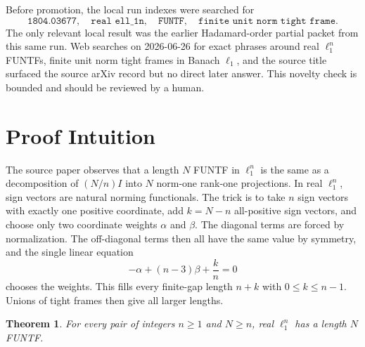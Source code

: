 \documentclass[11pt]{article}
\newtheorem{theorem}{Theorem}
\begin{document}
Before promotion, the local run indexes were searched for
\[
\texttt{1804.03677},\quad \texttt{real ell\_1\^{}n},\quad
\texttt{FUNTF},\quad \texttt{finite unit norm tight frame}.
\]
The only relevant local result was the earlier Hadamard-order partial packet
from this same run. Web searches on 2026-06-26 for exact phrases around real
$\ell_1^n$ FUNTFs, finite unit norm tight frames in Banach $\ell_1$, and the
source title surfaced the source arXiv record but no direct later answer.
This novelty check is bounded and should be reviewed by a human.

\section*{Proof Intuition}

The source paper observes that a length $N$ FUNTF in $\ell_1^n$ is the same
as a decomposition of $(N/n)I$ into $N$ norm-one rank-one projections. In
real $\ell_1^n$, sign vectors are natural norming functionals. The trick is
to take $n$ sign vectors with exactly one positive coordinate, add
$k=N-n$ all-positive sign vectors, and choose only two coordinate weights
$\alpha$ and $\beta$. The diagonal terms are forced by normalization. The
off-diagonal terms then all have the same value by symmetry, and the single
linear equation
\[
  -\alpha+(n-3)\beta+\frac{k}{n}=0
\]
chooses the weights. This fills every finite-gap length $n+k$ with
$0\le k\le n-1$. Unions of tight frames then give all larger lengths.

\begin{theorem}
\label{thm:full-real-l1}
For every pair of integers $n\ge 1$ and $N\ge n$, real $\ell_1^n$ has a
length $N$ FUNTF.
\end{theorem}
\end{document}
